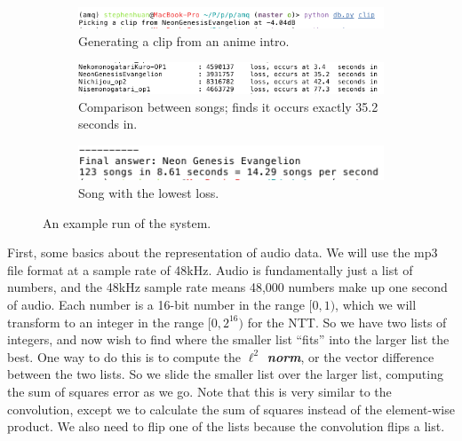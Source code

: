 \documentclass[11pt, oneside]{article}
\newcommand{\emphasis}[1]{\textbf{\textit{#1}}}
\theoremstyle{plain}
\theoremstyle{definition}
\begin{document}
\begin{figure}[h!]
    \centering
    \begin{subfigure}[h]{1 \textwidth}
      \includegraphics[scale=0.7]{clip.png}
      \caption{Generating a clip from an anime intro.}
    \end{subfigure}
    
    \begin{subfigure}[h]{0.3 \textwidth}
      \includegraphics[scale=0.5]{compare.png}
      \caption{Comparison between songs; finds it occurs exactly 35.2 seconds in.}
    \end{subfigure}
    \hfill
    \begin{subfigure}[h]{0.3 \textwidth}
      \includegraphics[scale=0.5]{result.png}
      \caption{Song with the lowest loss.}
    \end{subfigure}
    \caption{An example run of the system.}
\end{figure}

First, some basics about the representation of audio data. We will use the
mp3 file format at a sample rate of 48kHz. Audio is fundamentally just a list
of numbers, and the 48kHz sample rate means 48,000 numbers make up one second
of audio. Each number is a 16-bit number in the range \( [0, 1) \), which we
will transform to an integer in the range \( [0, 2^{16}) \) for the NTT.
So we have two lists of integers, and now wish to find where the smaller list
\enquote{fits} into the larger list the best. One way to do this is to compute
the \emphasis{\( \ell^2 \) norm}, or the vector difference between the two lists.
So we slide the smaller list over the larger list, computing the sum of squares
error as we go. Note that this is very similar to the convolution, except
we to calculate the sum of squares instead of the element-wise product.
We also need to flip one of the lists because the convolution flips a list.
\end{document}
